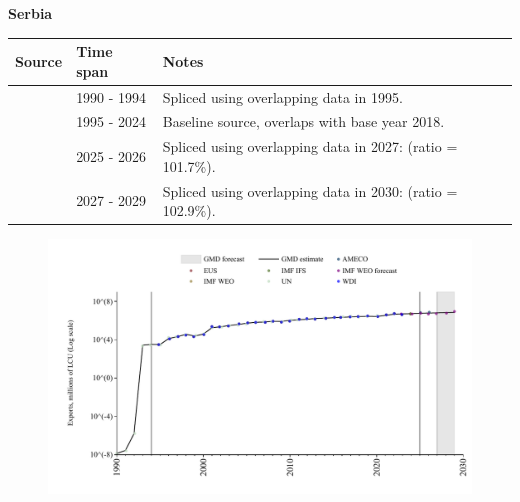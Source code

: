 \documentclass[12pt,a4paper,landscape]{article}
\begin{document}
\begin{adjustbox}{max totalsize={\paperwidth}{\paperheight},center}
\begin{minipage}[t][\textheight][t]{\textwidth}
\vspace*{0.5cm}
{}
\begin{center}
{\Large\bfseries Serbia}
\end{center}
\vspace{0.5cm}
\begin{table}[H]
\centering
\small
\begin{tabular}{|l|l|l|}
\hline
\textbf{Source} & \textbf{Time span} & \textbf{Notes} \\
\hline
\rowcolor{white}\cite{UN}& 1990 - 1994 &Spliced using overlapping data in 1995.\\
\rowcolor{lightgray}\cite{EUS}& 1995 - 2024 &Baseline source, overlaps with base year 2018.\\
\rowcolor{white}\cite{AMECO}& 2025 - 2026 &Spliced using overlapping data in 2027: (ratio = 101.7\%).\\
\rowcolor{lightgray}\cite{IMF_WEO_forecast}& 2027 - 2029 &Spliced using overlapping data in 2030: (ratio = 102.9\%).\\
\hline
\end{tabular}
\end{table}
\begin{figure}[H]
\centering
\includegraphics[width=\textwidth,height=0.6\textheight,keepaspectratio]{graphs/SRB_exports.pdf}
\end{figure}
\end{minipage}
\end{adjustbox}
\end{document}
